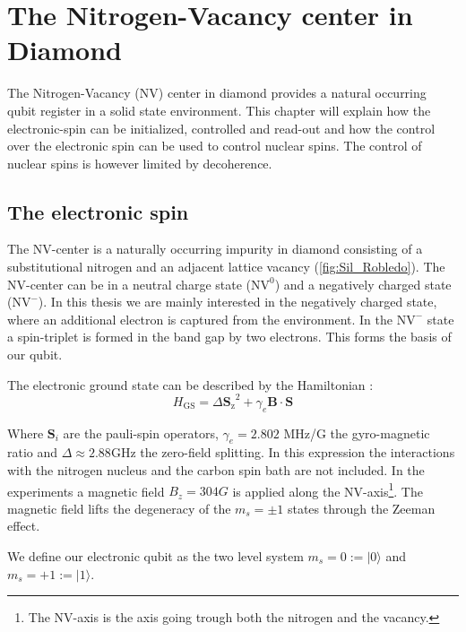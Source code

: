 \chapter{The Nitrogen-Vacancy center in Diamond}
The Nitrogen-Vacancy (NV) center in diamond provides a natural occurring qubit register in a solid state environment.
This chapter will explain how the electronic-spin can be initialized, controlled and read-out and how the control over the electronic spin can be used to control nuclear spins.
The control of nuclear spins is however limited by decoherence.

\section{The electronic spin}
The NV-center is a naturally occurring impurity in diamond consisting of a substitutional nitrogen and an adjacent lattice vacancy (\cref{fig:Sil_Robledo}). %
The NV-center can be in a neutral charge state ($\mathrm{NV}^0$) and a negatively charged state ($\mathrm{NV}^-$).
In this thesis we are mainly interested in the negatively charged state, where an additional electron is captured from the environment.
In the $\mathrm{NV}^-$ state a spin-triplet is formed in the band gap by two electrons.
This forms the basis of our qubit.

The electronic ground state can be described by the Hamiltonian \citep{Bernien2014Control}:
 \begin{equation}
H_\mathrm{GS} = \Delta {\bm{S}_\mathrm{z}}^2 + \gamma_e \mathbf{B} \cdot \bm{S}
\end{equation}

Where $\bm{S}_i$ are the pauli-spin operators,  $\gamma_e  = 2.802$ MHz/G  the gyro-magnetic ratio and $\Delta \approx 2.88 \mathrm{GHz}$ the zero-field splitting.
In this expression the interactions with the nitrogen nucleus and the carbon spin bath are not included.
In the experiments a magnetic field $B_z = 304G$ is applied along the NV-axis\footnote{The NV-axis is the axis going trough both the nitrogen and the vacancy. }.
The magnetic field lifts the degeneracy of the $m_s = \pm 1$ states through the Zeeman effect.

We define our electronic qubit  as the two level system  $m_s=0:=|0\rangle$ and $m_s = +1 := |1\rangle$.

